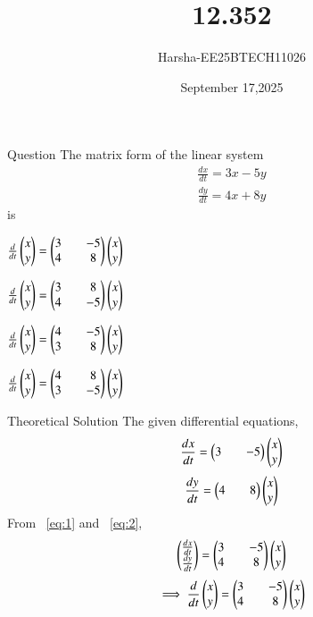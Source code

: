 \documentclass{beamer}
\title %
{12.352}
\date{September 17,2025}
\author %
{Harsha-EE25BTECH11026}
\begin{document}
\frame{\titlepage}


\begin{frame}{Question}
The matrix form of the linear system 
\begin{align*}
    \frac{dx}{dt}=3x-5y
\end{align*}
\begin{align*}
    \frac{dy}{dt}=4x+8y
\end{align*}
is
\begin{enumerate}
\begin{multicols}{2}
    \item $\frac{d}{dt}\begin{pmatrix}x\\y\end{pmatrix}=\begin{pmatrix}3&&-5\\4&&8\end{pmatrix}\begin{pmatrix}x\\y\end{pmatrix}$
    \item $\frac{d}{dt}\begin{pmatrix}x\\y\end{pmatrix}=\begin{pmatrix}3&&8\\4&&-5\end{pmatrix}\begin{pmatrix}x\\y\end{pmatrix}$
    \item $\frac{d}{dt}\begin{pmatrix}x\\y\end{pmatrix}=\begin{pmatrix}4&&-5\\3&&8\end{pmatrix}\begin{pmatrix}x\\y\end{pmatrix}$
    \item $\frac{d}{dt}\begin{pmatrix}x\\y\end{pmatrix}=\begin{pmatrix}4&&8\\3&&-5\end{pmatrix}\begin{pmatrix}x\\y\end{pmatrix}$
\end{multicols}
\end{enumerate}
\end{frame}

\begin{frame}{Theoretical Solution}
The given differential equations,
\begin{align}
    \frac{dx}{dt}=\begin{pmatrix}3&&-5\end{pmatrix}\begin{pmatrix}x\\y\end{pmatrix} \label{eq:1}
\end{align}
\begin{align}
    \frac{dy}{dt}=\begin{pmatrix}4&&8\end{pmatrix}\begin{pmatrix}x\\y\end{pmatrix} \label{eq:2}
\end{align}
From ~\eqref{eq:1} and ~\eqref{eq:2},
\begin{align}
    \begin{pmatrix}\frac{dx}{dt}\\\frac{dy}{dt}\end{pmatrix}=\begin{pmatrix}3&&-5\\4&&8\end{pmatrix}\begin{pmatrix}x\\y\end{pmatrix}
\end{align}
\begin{align}
    \implies \frac{d}{dt}\begin{pmatrix}x\\y\end{pmatrix}=\begin{pmatrix}3&&-5\\4&&8\end{pmatrix}\begin{pmatrix}x\\y\end{pmatrix}
\end{align}
\end{frame}
\end{document}
